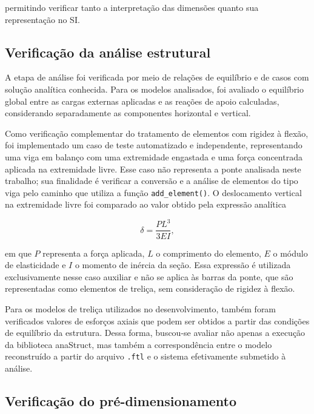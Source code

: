permitindo verificar tanto a interpretação das dimensões quanto sua representação no \gls{SI}.

\subsection{Verificação da análise estrutural}
\label{subsec:verificacao-analise}

A etapa de análise foi verificada por meio de relações de equilíbrio e de casos com solução analítica conhecida. Para os modelos analisados, foi avaliado o equilíbrio global entre as cargas externas aplicadas e as reações de apoio calculadas, considerando separadamente as componentes horizontal e vertical.

Como verificação complementar do tratamento de elementos com rigidez à flexão, foi implementado um caso de teste automatizado e independente, representando uma viga em balanço com uma extremidade engastada e uma força concentrada aplicada na extremidade livre. Esse caso não representa a ponte analisada neste trabalho; sua finalidade é verificar a conversão e a análise de elementos do tipo viga pelo caminho que utiliza a função \texttt{add\_element()}. O deslocamento vertical na extremidade livre foi comparado ao valor obtido pela expressão analítica

\begin{equation}
    \delta =
    \frac{PL^3}{3EI},
\end{equation}

em que \(P\) representa a força aplicada, \(L\) o comprimento do elemento, \(E\) o módulo de elasticidade e \(I\) o momento de inércia da seção. Essa expressão é utilizada exclusivamente nesse caso auxiliar e não se aplica às barras da ponte, que são representadas como elementos de treliça, sem consideração de rigidez à flexão.

Para os modelos de treliça utilizados no desenvolvimento, também foram verificados valores de esforços axiais que podem ser obtidos a partir das condições de equilíbrio da estrutura. Dessa forma, buscou-se avaliar não apenas a execução da biblioteca anaStruct, mas também a correspondência entre o modelo reconstruído a partir do arquivo \texttt{.ftl} e o sistema efetivamente submetido à análise.

\subsection{Verificação do pré-dimensionamento}
\label{subsec:verificacao-pre-dimensionamento}

